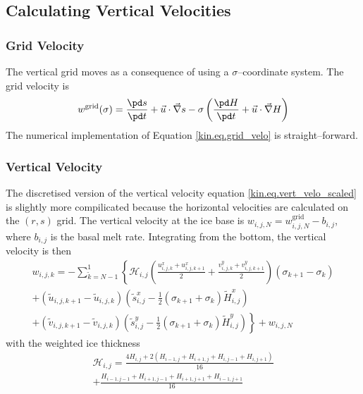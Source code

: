 \subsection{Calculating Vertical Velocities}

\subsubsection{Grid Velocity}
The vertical grid moves as a consequence of using a $\sigma$--coordinate system. The grid velocity is
\begin{equation}
  \label{kin.eq.grid_velo}
  w^{\text{grid}}(\sigma)=\frac{\pd s}{\pd t}+\vec u\cdot\vec\nabla s-\sigma\left(\frac{\pd H}{\pd t}+\vec u\cdot\vec\nabla H\right)
\end{equation}
The numerical implementation of Equation \eqref{kin.eq.grid_velo} is straight--forward.

\subsubsection{Vertical Velocity}
The discretised version of the vertical velocity equation \eqref{kin.eq.vert_velo_scaled} is slightly more compilicated because the horizontal velocities are calculated on the $(r,s)$ grid. The vertical velocity at the ice base is $w_{i,j,N}=w^{\text{grid}}_{i,j,N}-b_{i,j}$, where $b_{i,j}$ is the basal melt rate. Integrating from the bottom, the vertical velocity is then
\begin{equation}
  \label{kin.eq.wvel_unc}
  \begin{split}
  w_{i,j,k}=-\sum_{\tilde{k}=N-1}^1\left\{\mathcal{H}_{i,j}\left(\frac{u^x_{i,j,k}+u^x_{i,j,k+1}}{2}+\frac{v^y_{i,j,k}+v^y_{i,j,k+1}}{2}\right)(\sigma_{k+1}-\sigma_k)\right. \\
     +(\tilde{u}_{i,j,k+1}-\tilde{u}_{i,j,k})  \left(\tilde{s}^x_{i,j}-\frac12(\sigma_{k+1}+\sigma_k)\tilde{H}^x_{i,j}\right)  \\
     \left.+(\tilde{v}_{i,j,k+1}-\tilde{v}_{i,j,k})  \left(\tilde{s}^y_{i,j}-\frac12(\sigma_{k+1}+\sigma_k)\tilde{H}^y_{i,j}\right)\right\} + w_{i,j,N}
  \end{split}
\end{equation}
with the weighted ice thickness
\begin{equation*}
  \begin{split}
  \mathcal{H}_{i,j}=\frac{4H_{i,j}+2(H_{i-1,j}+H_{i+1,j}+H_{i,j-1}+H_{i,j+1})}{16}\\
  +\frac{H_{i-1,j-1}+H_{i+1,j-1}+H_{i+1,j+1}+H_{i-1,j+1}}{16}    
  \end{split}
\end{equation*}

